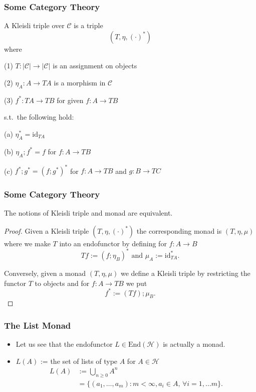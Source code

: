 \documentclass[xcolor=pdftex,dvipsnames,table]{beamer}
\newcommand{\C}{\ensuremath{\mathcal{C}}}
\newcommand{\id}{\ensuremath{\mathrm{id}}}
\newcommand{\typ}{\ensuremath{\mathcal{H}}}
\newcommand{\End}{\ensuremath{\mathrm{End}}}
\begin{document}
\begin{frame}
    \frametitle{Some Category Theory}
        \begin{definition} A Kleisli triple over \C{} is a triple
            \[(T,\eta,(\cdot)^*)\] where

        (1) $T : |\C| \rightarrow |\C|$ is an assignment on objects

        (2) $\eta_A : A \rightarrow TA$ is a morphism in \C{}

        (3) $f^* : TA \rightarrow TB$ for given $f : A \rightarrow TB$

        s.t.~the following hold:

        (a) $\eta_A^* = \id_{TA}$

        (b) $\eta_A;f^* = f$ for $f : A\rightarrow TB$

        (c) $f^*;g^* = (f;g^*)^*$ for $f : A \rightarrow TB$ and $g : B
        \rightarrow TC$
\end{definition}
\end{frame}

\begin{frame}
    \frametitle{Some Category Theory}
\begin{theorem}
The notions of Kleisli triple and monad are equivalent.
\end{theorem}\pause
\begin{proof}
Given a Kleisli triple \((T,\eta,(\cdot)^*)\) the corresponding
monad is $(T,\eta,\mu)$ where we make $T$ into an endofunctor by
defining for $f: A\rightarrow B$ \[Tf := (f;\eta_B)^* \text{ and }
\mu_A := \id_{TA}^*.\] \pause

Conversely, given a monad $(T,\eta,\mu)$ we define a Kleisli triple by
restricting the functor $T$ to objects and for $f: A\rightarrow TB$ we
put \[f^* := (Tf);\mu_B.\] \end{proof}
\end{frame}

\begin{frame}
    \frametitle{The List Monad}
    \begin{itemize}
        \item Let us see that the endofunctor $L \in \End(\typ)$ is
            actually a monad.\pause
        \item $L(A) $ := the set of lists of type $A$ for $A\in \typ$
            \begin{align*}
            L(A) & := \bigcup_{n \ge 0} A^n \\
            & = \{(a_1,\dots,a_m) : m < \infty, a_i \in A,\, \forall
            i=1,\dots m\}.
            \end{align*}
   \end{itemize}
\end{frame}
\end{document}
